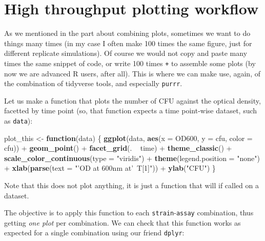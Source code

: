 \documentclass[]{book}
\newenvironment{Shaded}{}{}
\newcommand{\ControlFlowTok}[1]{\textcolor[rgb]{0.00,0.44,0.13}{\textbf{#1}}}
\newcommand{\DataTypeTok}[1]{\textcolor[rgb]{0.56,0.13,0.00}{#1}}
\newcommand{\KeywordTok}[1]{\textcolor[rgb]{0.00,0.44,0.13}{\textbf{#1}}}
\newcommand{\NormalTok}[1]{#1}
\newcommand{\OperatorTok}[1]{\textcolor[rgb]{0.40,0.40,0.40}{#1}}
\newcommand{\StringTok}[1]{\textcolor[rgb]{0.25,0.44,0.63}{#1}}
\begin{document}
\hypertarget{high-throughput-plotting-workflow}{%
\section{High throughput plotting workflow}\label{high-throughput-plotting-workflow}}

As we mentioned in the part about combining plots, sometimes we want to do things many times (in my case I often make 100 times the same figure, just for different replicate simulations). Of course we would not copy and paste many times the same snippet of code, or write 100 times \texttt{+} to assemble some plots (by now we are advanced R users, after all). This is where we can make use, again, of the combination of tidyverse tools, and especially \texttt{purrr}.

Let us make a function that plots the number of CFU against the optical density, facetted by time point (so, that function expects a time point-wise dataset, such as \texttt{data}):

\begin{Shaded}
\begin{Highlighting}[]
\NormalTok{plot_this <-}\StringTok{ }\ControlFlowTok{function}\NormalTok{(data) \{}
  \KeywordTok{ggplot}\NormalTok{(data, }\KeywordTok{aes}\NormalTok{(}\DataTypeTok{x =}\NormalTok{ OD600, }\DataTypeTok{y =}\NormalTok{ cfu, }\DataTypeTok{color =}\NormalTok{ cfu)) }\OperatorTok{+}
\StringTok{    }\KeywordTok{geom_point}\NormalTok{() }\OperatorTok{+}
\StringTok{    }\KeywordTok{facet_grid}\NormalTok{(. }\OperatorTok{~}\StringTok{ }\NormalTok{time) }\OperatorTok{+}
\StringTok{    }\KeywordTok{theme_classic}\NormalTok{() }\OperatorTok{+}
\StringTok{    }\KeywordTok{scale_color_continuous}\NormalTok{(}\DataTypeTok{type =} \StringTok{"viridis"}\NormalTok{) }\OperatorTok{+}
\StringTok{    }\KeywordTok{theme}\NormalTok{(}\DataTypeTok{legend.position =} \StringTok{"none"}\NormalTok{) }\OperatorTok{+}
\StringTok{    }\KeywordTok{xlab}\NormalTok{(}\KeywordTok{parse}\NormalTok{(}\DataTypeTok{text =} \StringTok{"'OD at 600nm at'~T[1]"}\NormalTok{)) }\OperatorTok{+}
\StringTok{    }\KeywordTok{ylab}\NormalTok{(}\StringTok{"CFU"}\NormalTok{)}
\NormalTok{\}}
\end{Highlighting}
\end{Shaded}

Note that this does not plot anything, it is just a function that will if called on a dataset.

The objective is to apply this function to each \texttt{strain}-\texttt{assay} combination, thus getting \emph{one plot} per combination. We can check that this function works as expected for a single combination using our friend \texttt{dplyr}:
\end{document}
